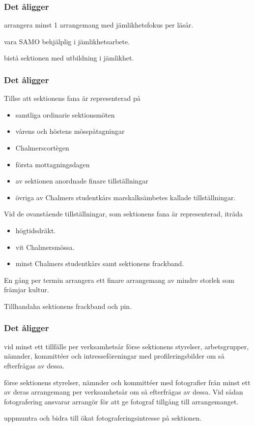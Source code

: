 \subsubsection{Det åligger \EQUALIT{}}
\begin{att}
    \item arrangera minst 1 arrangemang med jämlikhetsfokus per läsår.
    \item vara SAMO behjälplig i jämlikhetsarbete.
    \item bistå sektionen med utbildning i jämlikhet.
\end{att}

\subsubsection{Det åligger \FANBARERIT}
\label{sec:fanbarerit:function}
\begin{att}
	\item Tillse att sektionens fana är representerad på
	\begin{itemize}
		\item samtliga ordinarie sektionsmöten
		\item vårens och höstens mösspåtagningar
		\item Chalmerscortègen
		\item första mottagningsdagen
		\item av sektionen anordnade finare tillställningar
		\item övriga av Chalmers studentkårs marskalksämbetes kallade tillställningar.
	\end{itemize}
	\item Vid de ovanstående tillställningar, som sektionens fana är representerad, iträda
	\begin{itemize}
		\item högtidsdräkt.
		\item vit Chalmersmössa.
		\item minst Chalmers studentkårs samt sektionens frackband.
	\end{itemize}
	\item En gång per termin arrangera ett finare arrangemang av mindre storlek som främjar kultur.
	\item Tillhandaha sektionens frackband och pin.
\end{att}

\subsubsection{Det åligger \FLASHIT}
\begin{att}
	\item vid minst ett tillfälle per verksamhetsår förse sektionens styrelser, arbetsgrupper, nämnder, kommittéer och intresseföreningar med profileringsbilder om så efterfrågas av dessa.
	\item förse sektionens styrelser, nämnder och kommittéer med fotografier från minst ett av deras arrangemang per verksamhetsår om så efterfrågas av dessa. Vid sådan fotografering ansvarar arrangör för att ge fotograf tillgång till arrangemanget.
	\item uppmuntra och bidra till ökat fotograferingsintresse på sektionen.
\end{att}

